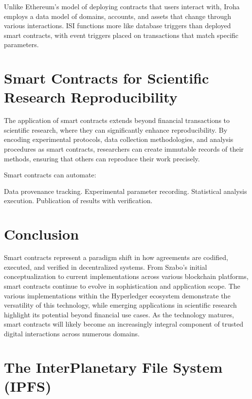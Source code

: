 \documentclass{article}
\begin{document}
Unlike Ethereum's model of deploying contracts that users interact with, Iroha employs a data model of domains, accounts, and assets that change through various interactions. ISI functions more like database triggers than deployed smart contracts, with event triggers placed on transactions that match specific parameters\cite{hyperledger2020iroha}.

\section{Smart Contracts for Scientific Research Reproducibility}

The application of smart contracts extends beyond financial transactions to scientific research, where they can significantly enhance reproducibility. By encoding experimental protocols, data collection methodologies, and analysis procedures as smart contracts, researchers can create immutable records of their methods, ensuring that others can reproduce their work precisely\cite{pilehchiha2022improving}.

Smart contracts can automate:

Data provenance tracking. Experimental parameter recording. Statistical analysis execution. Publication of results with verification.


\section{Conclusion}

Smart contracts represent a paradigm shift in how agreements are codified, executed, and verified in decentralized systems. From Szabo's initial conceptualization to current implementations across various blockchain platforms, smart contracts continue to evolve in sophistication and application scope. The various implementations within the Hyperledger ecosystem demonstrate the versatility of this technology, while emerging applications in scientific research highlight its potential beyond financial use cases. As the technology matures, smart contracts will likely become an increasingly integral component of trusted digital interactions across numerous domains.



\section{The InterPlanetary File System (IPFS)}
\end{document}
